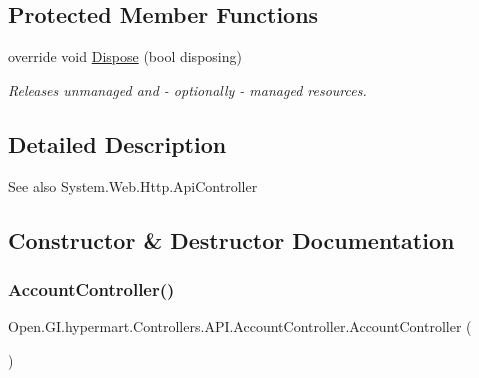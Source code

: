 \subsection*{Protected Member Functions}
\begin{DoxyCompactItemize}
\item 
override void \hyperlink{class_open_1_1_g_i_1_1hypermart_1_1_controllers_1_1_a_p_i_1_1_account_controller_a92393dd7d9b1c1d8f2f762ee31fbdd3d}{Dispose} (bool disposing)
\begin{DoxyCompactList}\small\item\em Releases unmanaged and -\/ optionally -\/ managed resources. \end{DoxyCompactList}\end{DoxyCompactItemize}


\subsection{Detailed Description}


\begin{DoxySeeAlso}{See also}
System.\+Web.\+Http.\+Api\+Controller


\end{DoxySeeAlso}


\subsection{Constructor \& Destructor Documentation}
\hypertarget{class_open_1_1_g_i_1_1hypermart_1_1_controllers_1_1_a_p_i_1_1_account_controller_ad19bf4f799cb21b28dc2e92454deca5f}{}\label{class_open_1_1_g_i_1_1hypermart_1_1_controllers_1_1_a_p_i_1_1_account_controller_ad19bf4f799cb21b28dc2e92454deca5f} 
\subsubsection{\texorpdfstring{Account\+Controller()}{AccountController()}}
{\footnotesize\ttfamily Open.\+G\+I.\+hypermart.\+Controllers.\+A\+P\+I.\+Account\+Controller.\+Account\+Controller (\begin{DoxyParamCaption}{ }\end{DoxyParamCaption})}



